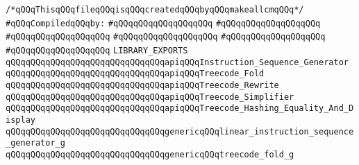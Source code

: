 \label{src/lib/compiler/back/low/lib/treecode.lib}
\verb|/*qQQqThisqQQqfileqQQqisqQQqcreatedqQQqbyqQQqmakeallcmqQQq*/|\newline
\newline
\verb|#qQQqCompiledqQQqby:|\newline
\verb|#qQQqqQQqqQQqqQQqqQQq|\newline
\verb|#qQQqqQQqqQQqqQQqqQQq|\newline
\verb|#qQQqqQQqqQQqqQQqqQQq|\newline
\verb|#qQQqqQQqqQQqqQQqqQQq|\newline
\verb|#qQQqqQQqqQQqqQQqqQQq|\newline
\verb|#qQQqqQQqqQQqqQQqqQQq|\newline
\newline
\verb|LIBRARY_EXPORTS|\newline
\newline
\verb|qQQqqQQqqQQqqQQqqQQqqQQqqQQqqQQqapiqQQqInstruction_Sequence_Generator|\newline
\verb|qQQqqQQqqQQqqQQqqQQqqQQqqQQqqQQqapiqQQqTreecode_Fold|\newline
\verb|qQQqqQQqqQQqqQQqqQQqqQQqqQQqqQQqapiqQQqTreecode_Rewrite|\newline
\verb|qQQqqQQqqQQqqQQqqQQqqQQqqQQqqQQqapiqQQqTreecode_Simplifier|\newline
\verb|qQQqqQQqqQQqqQQqqQQqqQQqqQQqqQQqapiqQQqTreecode_Hashing_Equality_And_Display|\newline
\newline
\verb|qQQqqQQqqQQqqQQqqQQqqQQqqQQqqQQqgenericqQQqlinear_instruction_sequence_generator_g|\newline
\verb|qQQqqQQqqQQqqQQqqQQqqQQqqQQqqQQqgenericqQQqtreecode_fold_g|\newline
